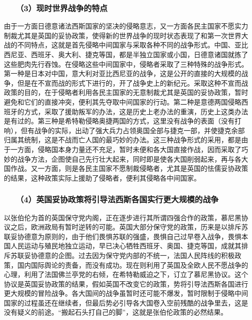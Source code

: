 \documentclass[cn,11pt,chinese]{elegantbook}
\def\myformat#1{\hfil\hfil #1}
\begin{document}
\subsubsection*{\myformat{　　（3）现时世界战争的特点}}
由于一方面日德意诸法西斯国家的坚决的侵略意志，又一方面各民主国家不愿实力制裁尤其是英国的妥协政策，使得新的世界战争的现时状态表现了和第一次世界大战的不同特点，这就是首先侵略中间国家与采取各种不同的战争形式。中国、亚比西尼亚、西班牙、奥大利、捷克等国，都是半独立国家或小国，日德意诸国就拣了这些肥肉先行吞蚀。在侵略这些中间国家中，侵略者采取了三种特殊的战争形式。第一种是日本对中国，意大利对亚比西尼亚的战争，这是公开的直接的大规模的战争，但是在不宣而战的形式下进行的，开了战争史上的新纪元。采取这种不宣而战政策的目的，在于侵略者利用各民主国家的无意制裁尤其是英国的妥协政策，暂时避免和它们的直接冲突，便利其先夺取中间国家的行动。第二种是意德两国侵略西班牙的方式，采取了援助叛军的办法，这是历史上老办法的重演，历史上这类办法是有过的。第三种是希特勒侵略奥捷两国的方式，这里没有战争的表面（没有打响），但有战争的实际，出动了强大兵力占领奥国全部与捷克一部，并使捷克余部归属其统制，这是不战而亡人国的最巧妙的办法。这三种战争形式的采用，都是由于一方面，侵略国本身力量还不充足，暂时未便和各大国直接作战，因而采取了巧妙的战争方法，企图使自己先行壮大起来，同时即是使各大国削弱起来，再与各大国作战。又一方面，则是各民主国家不愿制裁侵略者，尤其是英国的怯儒妥协政策的结果，这种政策实际上援助了侵略者，便利其侵略各中间国家。\\
\subsubsection*{\myformat{　　（4）英国妥协政策将引导法西斯各国实行更大规模的战争}}
以张伯伦为首的英国保守党内阁，正在逐步进行其所谓四强合作的政策，慕尼黑协议之后，欧洲政局有暂时逆转的可能。英国大部分保守党的政策，历来是以排斥苏联妥协德意为原则的，由于他们畏惧苏联的强盛，畏惧自己过早卷入战争，畏惧本国人民运动与殖民地独立运动，早已决心牺牲西班牙、奥国、捷克等国，成就其排斥苏联妥协德意的企图。过去因为保守党内部的不统一，法国人民阵线的积极政策，国内国际舆论的责备，而没有成功。现在则利用了英国及全欧人民不愿战争的心理，利用了法国佛兰亭党的右倾，在希特勒威迫之下，订立了慕尼黑协议。这个协议是英国妥协政策的结果，假如英国不改变它的政策，势将引导法西斯各国进行更大规模的冒险战争。各大国间的战争虽暂时还可能不爆发，暂时限制于侵略中间国家的过程虽还在继续者，但最后势必引导各大国卷入空前残酷的战争里去，这是没有疑义的前途。“搬起石头打自己的脚”，这就是张伯伦政策的必然结果。\\
\end{document}
